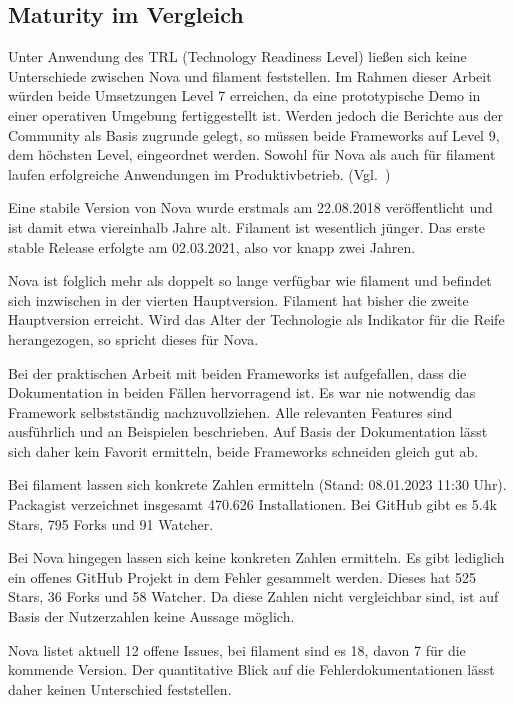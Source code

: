 \subsection{Maturity im Vergleich}
Unter Anwendung des TRL (Technology Readiness Level) ließen sich keine Unterschiede zwischen Nova und filament feststellen.
Im Rahmen dieser Arbeit würden beide Umsetzungen Level 7 erreichen, da eine prototypische Demo in einer operativen Umgebung fertiggestellt ist.
Werden jedoch die Berichte aus der Community als Basis zugrunde gelegt, so müssen beide Frameworks auf Level 9, dem höchsten Level, eingeordnet werden.
Sowohl für Nova als auch für filament laufen erfolgreiche Anwendungen im Produktivbetrieb.
(Vgl.~\cite{technology-readiness})

Eine stabile Version von Nova wurde erstmals am 22.08.2018\cite{nova-releases} veröffentlicht und ist damit etwa viereinhalb Jahre alt.
Filament ist wesentlich jünger.
Das erste stable Release erfolgte am 02.03.2021\cite{filament-releases}, also vor knapp zwei Jahren.

Nova ist folglich mehr als doppelt so lange verfügbar wie filament und befindet sich inzwischen in der vierten Hauptversion\cite{nova-releases}.
Filament hat bisher die zweite Hauptversion\cite{filament-releases} erreicht.
Wird das Alter der Technologie als Indikator für die Reife herangezogen, so spricht dieses für Nova.

Bei der praktischen Arbeit mit beiden Frameworks ist aufgefallen, dass die Dokumentation in beiden Fällen hervorragend ist.
Es war nie notwendig das Framework selbstständig nachzuvollziehen.
Alle relevanten Features sind ausführlich und an Beispielen beschrieben.
Auf Basis der Dokumentation lässt sich daher kein Favorit ermitteln, beide Frameworks schneiden gleich gut ab.

Bei filament lassen sich konkrete Zahlen ermitteln (Stand: 08.01.2023 11:30 Uhr).
Packagist verzeichnet insgesamt 470.626 Installationen.
Bei GitHub gibt es 5.4k Stars, 795 Forks und 91 Watcher.

Bei Nova hingegen lassen sich keine konkreten Zahlen ermitteln.
Es gibt lediglich ein offenes GitHub Projekt in dem Fehler gesammelt werden.
Dieses hat 525 Stars, 36 Forks und 58 Watcher.
Da diese Zahlen nicht vergleichbar sind, ist auf Basis der Nutzerzahlen keine Aussage möglich.

Nova listet aktuell 12 offene Issues, bei filament sind es 18, davon 7 für die kommende Version.
Der quantitative Blick auf die Fehlerdokumentationen lässt daher keinen Unterschied feststellen.

